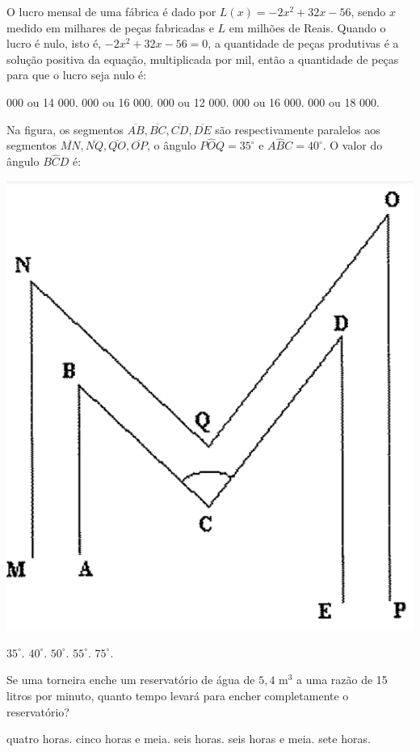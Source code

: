 \begin{question}%
O lucro mensal de uma fábrica é dado por \(L(x) = -2x^2 + 32x - 56\), sendo \(x\) medido em milhares de peças fabricadas e \(L\) em milhões de Reais. Quando o lucro é nulo, isto é, \(-2x^2 + 32x - 56 = 0\), a quantidade de peças produtivas é a solução positiva da equação, multiplicada por mil, então a quantidade de peças para que o lucro seja nulo é:
    \begin{tasks}
         000 ou 14 000.
         000 ou 16 000.
         000 ou 12 000.
         000 ou 16 000.
         000 ou 18 000.
    \end{tasks}
\end{question}

\begin{question}%
Na figura, os segmentos \(\overline{AB}, \overline{BC}, \overline{CD}, \overline{DE}\) são respectivamente paralelos aos segmentos \(\overline{MN}, \overline{NQ}, \overline{QO}, \overline{OP}\), o ângulo \(P\hat{O}Q = 35^\circ\) e \(A\hat{B}C = 40^\circ\). O valor do ângulo \(B\hat{C}D\) é:

    \centering
    \includegraphics[width=.3\textwidth]{CONCURSO/EAM/IMAGES/2004/EAM200402IMG.png}

    \begin{tasks}
        \task \(35^\circ\).
        \task \(40^\circ\).
        \task \(50^\circ\).
        \task \(55^\circ\).
        \task \(75^\circ\).
    \end{tasks}
\end{question}

\begin{question}%
Se uma torneira enche um reservatório de água de \(5,4\) m\(^3\) a uma razão de 15 litros por minuto, quanto tempo levará para encher completamente o reservatório?
    \begin{tasks}
        \task quatro horas.
        \task cinco horas e meia.
        \task seis horas.
        \task seis horas e meia.
        \task sete horas.
    \end{tasks}
\end{question}

